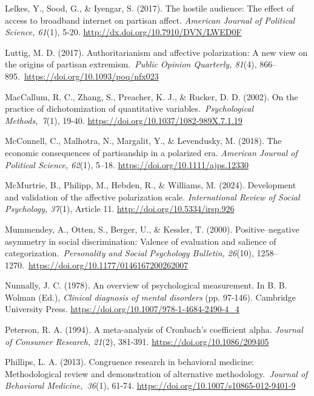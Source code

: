 \documentclass[authordate, meta, issue]{jote-new-article}
\begin{document}
	Lelkes, Y., Sood, G., \& Iyengar, S. (2017). The hostile audience: The effect of access to broadband internet on partisan affect. \emph{American Journal of Political Science, 61}(1), 5-20. \url{http://dx.doi.org/10.7910/DVN/LWED0F}



	Luttig, M. D. (2017). Authoritarianism and affective polarization: A new view on the origins of partisan extremism. \emph{Public Opinion Quarterly, 81}(4), 866--895. \url{https://doi.org/10.1093/poq/nfx023}



	MacCallum, R. C., Zhang, S., Preacher, K. J., \& Rucker, D. D. (2002). On the practice of dichotomization of quantitative variables.\emph{ Psychological Methods, 7}(1), 19-40. \url{https://doi.org/10.1037/1082-989X.7.1.19}



	McConnell, C., Malhotra, N., Margalit, Y., \& Levendusky, M. (2018). The economic consequences of partisanship in a polarized era. \emph{American Journal of Political Science, 62}(1), 5--18. \url{https://doi.org/10.1111/ajps.12330}



	McMurtrie, B., Philipp, M., Hebden, R., \& Williams, M. (2024). Development and validation of the affective polarization scale. \emph{International Review of Social Psychology, 37}(1), Article 11. \url{http://doi.org/10.5334/irsp.926}



	Mummendey, A., Otten, S., Berger, U., \& Kessler, T. (2000). Positive--negative asymmetry in social discrimination: Valence of evaluation and salience of categorization. \emph{Personality and Social Psychology Bulletin, 26}(10), 1258--1270. \url{https://doi.org/10.1177/0146167200262007}



	Nunnally, J. C. (1978). An overview of psychological measurement. In B. B. Wolman (Ed.), \emph{Clinical diagnosis of mental disorders }(pp. 97-146). Cambridge University Press. \url{https://doi.org/10.1007/978-1-4684-2490-4\_4}



	Peterson, R. A. (1994). A meta-analysis of Cronbach's coefficient alpha. \emph{Journal of Consumer Research, 21}(2), 381-391. \url{https://doi.org/10.1086/209405}



	Phillips, L. A. (2013). Congruence research in behavioral medicine: Methodological review and demonstration of alternative methodology.\emph{ Journal of Behavioral Medicine, 36}(1), 61-74. \url{https://doi.org/10.1007/s10865-012-9401-9}
\end{document}
